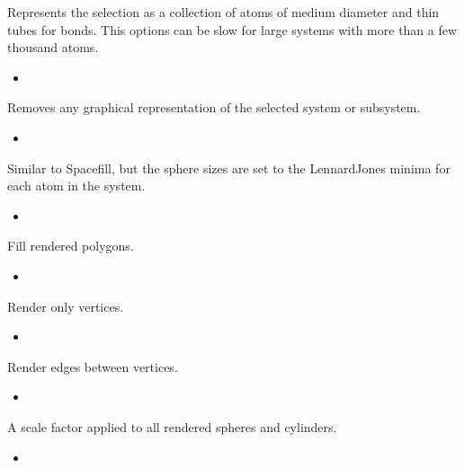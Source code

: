\documentclass[letterpaper,11pt,english]{sphinxmanual}
\begin{document}
\sphinxAtStartPar
Represents the selection as a collection of atoms of medium diameter and thin tubes for bonds. This options can be slow for large systems with more than a few thousand atoms.
\begin{itemize}
\item {} 
\sphinxAtStartPar
{}

\end{itemize}

\sphinxAtStartPar
Removes any graphical representation of the selected system or subsystem.
\begin{itemize}
\item {} 
\sphinxAtStartPar
{}

\end{itemize}

\sphinxAtStartPar
Similar to Spacefill, but the sphere sizes are set to the Lennard\sphinxhyphen{}Jones minima for each atom in the system.
\begin{itemize}
\item {} 
\sphinxAtStartPar
{}

\end{itemize}

\sphinxAtStartPar
Fill rendered polygons.
\begin{itemize}
\item {} 
\sphinxAtStartPar
{}

\end{itemize}

\sphinxAtStartPar
Render only vertices.
\begin{itemize}
\item {} 
\sphinxAtStartPar
{}

\end{itemize}

\sphinxAtStartPar
Render edges between vertices.
\begin{itemize}
\item {} 
\sphinxAtStartPar
{}

\end{itemize}

\sphinxAtStartPar
A scale factor applied to all rendered spheres and cylinders.
\begin{itemize}
\item {} 
\sphinxAtStartPar
{}

\end{itemize}
\end{document}
